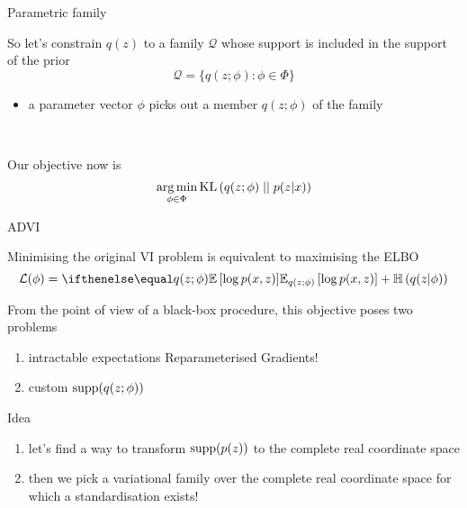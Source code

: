 \documentclass[14pt]{beamer}
\begin{document}
\begin{frame}{Parametric family}

	 So let's constrain $q(z)$ to a family $\mathcal Q$ whose support is included in the support of the prior
	 \begin{equation*}
	 	\mathcal Q = \{q(z; \phi): \phi \in \Phi \}
	\end{equation*}
	\vspace{-10pt}
	 \begin{itemize}
	 	\item a parameter vector $\phi$ picks out a member $q(z; \phi)$ of the family
	\end{itemize}
	
	~
	
	Our objective now is 
	 \begin{equation*}
		\operatorname*{arg\,min}_{\phi \in \Phi} \operatorname{KL}\left(q(z; \phi)\mid\mid p(z|x)\right)
	\end{equation*}

\end{frame}

\begin{frame}{ADVI}
	
	Minimising the original VI problem is equivalent to maximising the ELBO
	\begin{equation}
		\mathcal L(\phi) = \E[q(z; \phi)]{\log p(x, z)} + \Ent{q(z|\phi)}
	\end{equation}
	
	From the point of view of a black-box procedure, this objective poses two problems
	\begin{enumerate}
		\item intractable expectations \pause Reparameterised Gradients!
		\item custom $\operatorname{supp}(q(z; \phi))$ 
	\end{enumerate}
	
	Idea
	\begin{enumerate}
		\item let's find a way to transform $\operatorname{supp}(p(z))$ to the complete real coordinate space
		\item then we pick a variational family over the complete real coordinate space for which a standardisation exists!
	\end{enumerate}
	
\end{frame}



\begin{frame}[allowframebreaks]


\end{frame}
\end{document}
